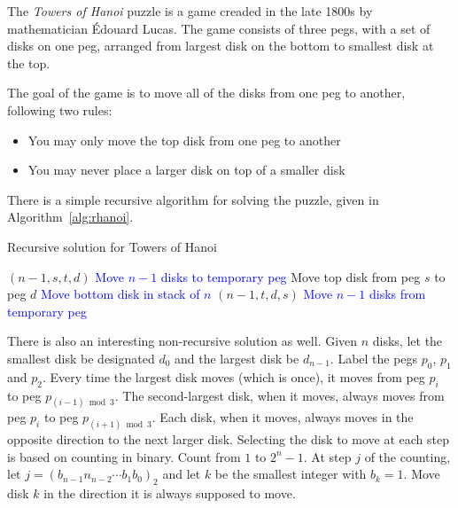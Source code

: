 \item{}
The \emph{Towers of Hanoi} puzzle is a game creaded in the late 1800s by
mathematician \'{E}douard Lucas. The game consists of three pegs, with a set
of disks on one peg, arranged from largest disk on the bottom to smallest disk
at the top.\parend

The goal of the game is to move all of the disks from one peg to another,
following two rules:
\begin{itemize}
  \item You may only move the top disk from one peg to another
  \item You may never place a larger disk on top of a smaller disk
\end{itemize}

There is a simple recursive algorithm for solving the puzzle, given in
Algorithm~\ref{alg:rhanoi}.

\begin{algorithm}[H]
  \vskip6pt

  \caption{Recursive solution for Towers of Hanoi}\label{alg:rhanoi}
  \begin{algorithmic}[1]
    \Statex
        $(n-1,s,t,d)$
        \Comment\textcolor{blue}{Move $n-1$ disks to temporary peg}
        \State Move top disk from peg $s$ to peg $d$
        \Comment\textcolor{blue}{Move bottom disk in stack of $n$}
        $(n-1,t,d,s)$
        \Comment\textcolor{blue}{Move $n-1$ disks from temporary peg}
      \EndIf
    \EndProcedure
  \end{algorithmic}
\end{algorithm}
There is also an interesting non-recursive solution as well. Given $n$ disks,
let the smallest disk be designated $d_0$ and the largest disk be $d_{n-1}$.
Label the pegs $p_0$, $p_1$ and $p_2$. Every time the largest disk moves (which
is once), it moves from peg $p_i$ to peg $p_{(i-1)\bmod 3}$. The second-largest
disk, when it moves, always moves from peg $p_i$ to peg $p_{(i+1)\bmod 3}$.
Each disk, when it moves, always moves in the opposite direction to the next
larger disk.\parend
Selecting the disk to move at each step is based on counting in binary. Count
from $1$ to $2^n-1$. At step $j$ of the counting, let $j=(b_{n-1}n_{n-2}\cdots
b_1b_0)_2$ and let $k$ be the smallest integer with $b_k=1$. Move disk $k$ in
the direction it is always supposed to move.\parend

